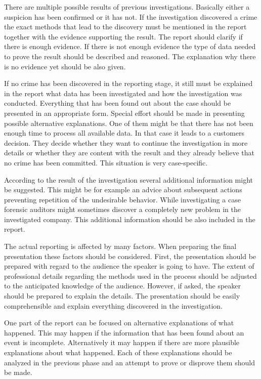 There are multiple possible results of previous investigations. Basically either a suspicion has been confirmed or it has not. If the investigation discovered a crime the exact methods that lead to the discovery must be mentioned in the report together with the evidence supporting the result. The report should clarify if there is enough evidence. If there is not enough evidence the type of data needed to prove the result should be described and reasoned. The explanation why there is no evidence yet should be also given.


If no crime has been discovered in the reporting stage, it still must be explained in the report what data has been investigated and how the investigation was conducted. Everything that has been found out about the case should be presented in an appropriate form. Special effort should be made in presenting possible alternative explanations. One of them might be that there has not been enough time to process all available data. In that case it leads to a customers decision. They decide whether they want to continue the investigation in more details or whether they are content with the result and they already believe that no crime has been committed. This situation is very case-specific. 

According to the result of the investigation several additional information might be suggested. This might be for example an advice about subsequent actions preventing repetition of the undesirable behavior. While investigating a case forensic auditors might sometimes discover a completely new problem in the investigated company. This additional information should be also included in the report. 

The actual reporting is affected by many factors. When preparing the final presentation these factors should be considered. First, the presentation should be prepared with regard to the audience the speaker is going to have. The extent of professional details regarding the methods used in the process should be adjusted to the anticipated knowledge of the audience. However, if asked, the speaker should be prepared to explain the details. The presentation should be easily comprehensible and explain everything discovered in the investigation. 

One part of the report can be focused on alternative explanations of what happened. This may happen if the information that has been found about an event is incomplete. Alternatively it may happen if there are more plausible explanations about what happened. Each of these explanations should be analyzed in the previous phase and an attempt to prove or disprove them should be made.


